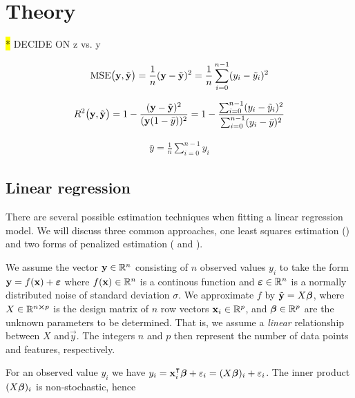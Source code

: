 \section{Theory}\label{sec:theroy}




\hl{*} DECIDE ON z vs. y

\begin{align}\label{eq:MSE}
    \MSE{\vec{y}, \tilde{\vec{y}}}= \frac{1}{n}(\vec{y}-\tilde{\vec{y}})^2= \frac{1}{n}\sum_{i=0}^{n-1} (y_i - \tilde{y}_i)^2
\end{align}

\begin{align}\label{eq:R2}
    \Rtwo {\vec{y}, \tilde{\vec{y}}} =1 - \frac{(\vec{y}-\tilde{\vec{y}})^2}{(\vec{y}(1-\bar{y}))^2}= 1 - \frac{\sum_{i=0}^{n-1}(y_i-\tilde{y}_i)^2}{\sum_{i=0}^{n-1}(y_i-\bar{y})^2}
\end{align}

\begin{align*}
    \bar{y} = \frac{1}{n}\sum_{i=0}^{n-1} y_i
\end{align*}



\subsection{Linear regression}\label{sec:regression}

There are several possible estimation techniques when fitting a linear regression model. We will discuss three common approaches, one least squares estimation () and two forms of penalized estimation ( and ).

We assume the vector $\vec{y} \in \RR[n]$ consisting of $n$ observed values $y_i$ to take the form $\vec{y}=f(\vec{x})+\svec{\epsilon}$ where $f(\vec{x})\in\RR[n]$ is a continous function and $\svec{\epsilon}\in \RR[n] $ is a normally distributed noise of standard deviation $\sigma$. We approximate $f$ by $\tilde{\vec{y}}=X\svec{\beta}$, where $X\in \RR[n\cross p]$ is the design matrix of $n$ row vectors $\vec{x}_i\in \RR[p]$, and $\svec{\beta}\in \RR[p]$ are the unknown parameters to be determined. That is, we assume a \textit{linear} relationship between $X$ and$\vec{y}$. The integers $n$ and $p$ then represent the number of data points and features, respectively. 

For an observed value $y_i$ we have $y_i = \vec{x}_i\TT \svec{\beta} + \epsilon_i = \Xbi+ \epsilon_i$. The inner product $\Xbi$ is non-stochastic, hence 


